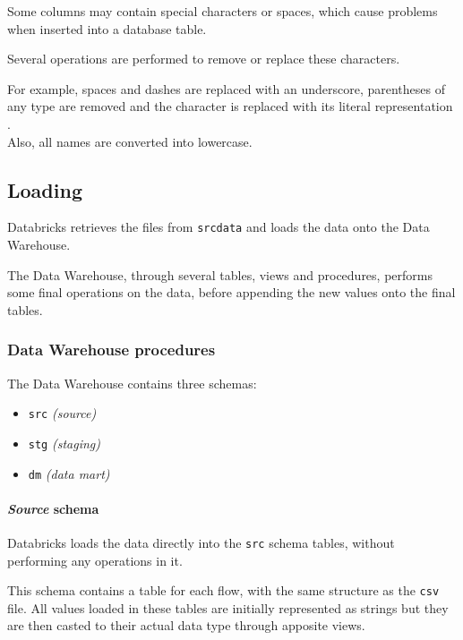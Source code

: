         Some columns may contain special characters or spaces, which cause problems when inserted into a database table.
        
        Several operations are performed to remove or replace these characters.
        
        For example, spaces and dashes are replaced with an underscore, parentheses of any type are removed and the character \code{\&} is replaced with its literal representation . \\
        Also, all names are converted into lowercase.
            
\subsection{Loading}
    Databricks retrieves the files from \texttt{srcdata} and loads the data onto the Data Warehouse.
    
    The Data Warehouse, through several tables, views and procedures, performs some final operations on the data, before appending the new values onto the final tables.
    
    \subsubsection{Data Warehouse procedures}
        The Data Warehouse contains three schemas:
            \begin{itemize}
                \item \texttt{src} \textit{(source)}
                \item \texttt{stg} \textit{(staging)}
                \item \texttt{dm}  \textit{(data mart)}
            \end{itemize}
        
        \paragraph{\textit{Source} schema}    
            Databricks loads the data directly into the \texttt{src} schema tables, without performing any operations in it.
            
            This schema contains a table for each flow, with the same structure as the \texttt{csv} file.
            All values loaded in these tables are initially represented as strings but they are then casted to their actual data type through apposite views.
            
